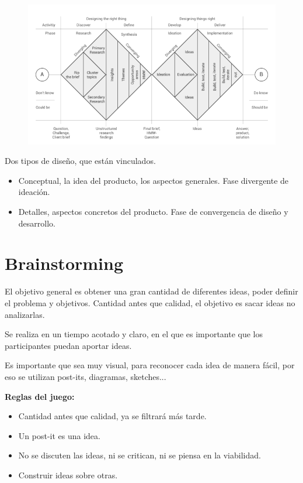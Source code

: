 \documentclass[12pt, twoside, openright]{report} %
\begin{document}
\begin{figure}[H]
	{\includegraphics[scale=.4]{2021-03-20 21_09_36-L5.pdf - Foxit Reader.png}}
\end{figure}

Dos tipos de diseño, que están vinculados.
\begin{itemize}
	\item Conceptual, la idea del producto, los aspectos generales. Fase divergente de ideación.
	\item Detalles, aspectos concretos del producto. Fase de convergencia de diseño y desarrollo.
\end{itemize}
\pagebreak

\section{Brainstorming}
El objetivo general es obtener una gran cantidad de diferentes ideas, poder definir el problema y objetivos. Cantidad antes que calidad, el objetivo es sacar ideas no analizarlas.

Se realiza en un tiempo acotado y claro, en el que es importante que los participantes puedan aportar ideas.

Es importante que sea muy visual, para reconocer cada idea de manera fácil, por eso se utilizan post-its, diagramas, sketches...

\textbf{Reglas del juego:}
\begin{itemize}
	\item Cantidad antes que calidad, ya se filtrará más tarde.
	\item Un post-it es una idea.
	\item No se discuten las ideas, ni se critican, ni se piensa en la viabilidad.
	\item Construir ideas sobre otras.
\end{itemize}
\end{document}
